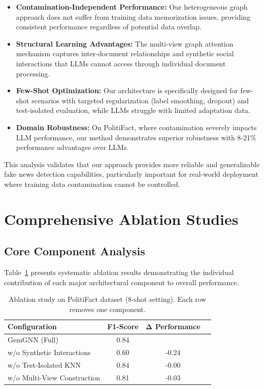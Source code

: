 \begin{itemize}
    \item \textbf{Contamination-Independent Performance:} Our heterogeneous graph approach does not suffer from training data memorization issues, providing consistent performance regardless of potential data overlap.
    
    \item \textbf{Structural Learning Advantages:} The multi-view graph attention mechanism captures inter-document relationships and synthetic social interactions that LLMs cannot access through individual document processing.
    
    \item \textbf{Few-Shot Optimization:} Our architecture is specifically designed for few-shot scenarios with targeted regularization (label smoothing, dropout) and test-isolated evaluation, while LLMs struggle with limited adaptation data.
    
    \item \textbf{Domain Robustness:} On PolitiFact, where contamination severely impacts LLM performance, our method demonstrates superior robustness with 8-21\% performance advantages over LLMs.
\end{itemize}

This analysis validates that our approach provides more reliable and generalizable fake news detection capabilities, particularly important for real-world deployment where training data contamination cannot be controlled.

\section{Comprehensive Ablation Studies}

\subsection{Core Component Analysis}

Table~\ref{tab:ablation_components} presents systematic ablation results demonstrating the individual contribution of each major architectural component to overall performance.

\begin{table}[htbp]
\centering
\caption{Ablation study on PolitiFact dataset (8-shot setting). Each row removes one component.}
\label{tab:ablation_components}
\begin{tabular}{lccc}
\toprule
\textbf{Configuration} & \textbf{F1-Score} & \textbf{Δ Performance} \\
\midrule
GemGNN (Full) & 0.84 &  \\
\midrule
w/o Synthetic Interactions & 0.60 & -0.24 \\
w/o Test-Isolated KNN & 0.84 & -0.00 \\
w/o Multi-View Construction & 0.81 & -0.03 \\
\midrule
\bottomrule
\end{tabular}
\end{table}

